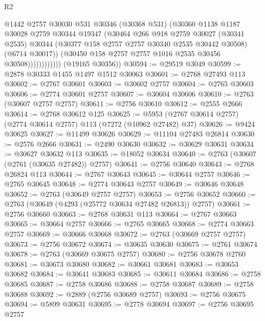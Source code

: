 \begin{lexlean}{R2}
\begin{coremodule}
                          @1442
                          @2757
                          @30030
                          @531
                          @30346
                          (@30368 @531)
                          (@30360
                            @1138
                            @1187
                            @30028
                            @2759
                            @30344
                            @19347
                            (@30464
                              @266
                              @918
                              @2759
                              @30027
                              (@30341 @2535)
                              @30344
                              (@30377 @158 @2757 @2757 @30340 @2535 @30442 @30508)
                              (@6714 @30017))
                            (@30450 @158 @2757 @2757 @1016 @2535 @30456 @30508))))))))))))
      (@19165 @30356))
@30594 := @29519 @3049
@30599 := @2878 @30333 @1455 @1497 @1512 @30063
@30601 := @2768 @27493 @113
@30602 := @2767 @30601
@30603 := @30602 @2757
@30604 := @2765 @30603
@30606 := @2774 @30601 @2757
@30607 := @30604 @30606
@30610 := @2763 (@30607 @2757 @2757)
@30611 := @2756 @30610
@30612 := @2555 @2666
@30614 := @2768 @30612 @125
@30625 := @5953 (@2767 @30614 @2757) (@2774 @30614 @2757) @113 (@7272 (@10962 @27482) @37)
@30626 := @9424 @30625
@30627 := @11499 @30626
@30629 := @11104 @27483 @26814
@30630 := @2576 @2666
@30631 := @2490 @30630
@30632 := @30629 @30631
@30634 := @30627 @30632 @113
@30635 := @18052 @30634
@30640 := @2763 (@30607 (@2761 (@30635 @27482)) @2757)
@30641 := @2756 @30640
@30643 := @2768 @26824 @113
@30644 := @2767 @30643
@30645 := @30644 @2757
@30646 := @2765 @30645
@30648 := @2774 @30643 @2757
@30649 := @30646 @30648
@30652 := @2763 (@30649 @2757 @2757)
@30653 := @2756 @30652
@30660 := @2763 (@30649 (@4293 (@25772 @30634 @27482 @26813)) @2757)
@30661 := @2756 @30660
@30663 := @2768 @30631 @113
@30664 := @2767 @30663
@30665 := @30664 @2757
@30666 := @2765 @30665
@30668 := @2774 @30663 @2757
@30669 := @30666 @30668
@30672 := @2763 (@30669 @2757 @2757)
@30673 := @2756 @30672
@30674 := @30635 @30630
@30675 := @2761 @30674
@30678 := @2763 (@30669 @30675 @2757)
@30680 := @2756 @30678 @2760
@30681 := @30673 @30680
@30682 := @30661 @30681
@30683 := @30653 @30682
@30684 := @30641 @30683
@30685 := @30611 @30684
@30686 := @2758 @30685
@30687 := @2758 @30686
@30688 := @2758 @30687
@30689 := @2758 @30688
@30692 := @2889 (@2756 @30689 @2757)
@30693 := @2756 @30675
@30694 := @5899 @30631
@30695 := @2778 @30694
@30697 := @2756 @30695 @2757

\end{coremodule}
\end{lexlean}
